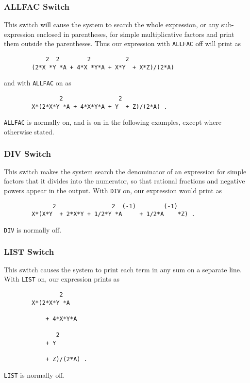 \subsubsection{ALLFAC Switch}
\hypertarget{switch:ALLFAC}{}

This switch will cause the system to search the whole expression, or any
sub-expression enclosed in parentheses, for simple multiplicative factors
and print them outside the parentheses. Thus our expression with {\tt ALLFAC}
off will print as
\begin{verbatim}
            2  2        2          2
        (2*X *Y *A + 4*X *Y*A + X*Y  + X*Z)/(2*A)
\end{verbatim}
and with {\tt ALLFAC} on as
\begin{verbatim}
                2                2
        X*(2*X*Y *A + 4*X*Y*A + Y  + Z)/(2*A) .
\end{verbatim}
{\tt ALLFAC} is normally on, and is on in the following examples, except
where otherwise stated.

\subsubsection{DIV Switch}
\hypertarget{switch:DIV}{}

This switch makes the system search the denominator of an expression for
simple factors that it divides into the numerator, so that rational
fractions and negative powers appear in the output. With {\tt DIV} on, our
expression would print as
\begin{verbatim}
              2                2  (-1)        (-1)
        X*(X*Y  + 2*X*Y + 1/2*Y *A     + 1/2*A    *Z) .
\end{verbatim}
{\tt DIV} is normally off.

\subsubsection{LIST Switch}
\hypertarget{switch:LIST}{}

This switch causes the system to print each term in any sum on a separate
line. With {\tt LIST} on, our expression prints as
\begin{verbatim}
                2
        X*(2*X*Y *A

            + 4*X*Y*A

               2
            + Y

            + Z)/(2*A) .
\end{verbatim}
{\tt LIST} is normally off.


